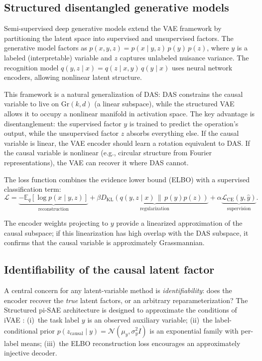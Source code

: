 \documentclass{article}
\newcommand{\Gr}{\mathrm{Gr}}
\begin{document}
\subsection{Structured disentangled generative models}
\label{sec:structured_vae}

Semi-supervised deep generative models \citep{narayanaswamy2017learning} extend
the VAE framework \citep{kingma2014auto} by partitioning the latent space into
supervised and unsupervised factors. The generative model factors as
$p(x, y, z) = p(x \mid y, z) \, p(y) \, p(z)$, where $y$ is a labeled
(interpretable) variable and $z$ captures unlabeled nuisance variance. The
recognition model $q(y, z \mid x) = q(z \mid x, y) \, q(y \mid x)$ uses neural
network encoders, allowing nonlinear latent structure.

This framework is a natural generalization of DAS: DAS constrains the causal
variable to live on $\Gr(k,d)$ (a linear subspace), while the structured VAE
allows it to occupy a nonlinear manifold in activation space. The key advantage
is disentanglement: the supervised factor $y$ is trained to predict the
operation's output, while the unsupervised factor $z$ absorbs everything else.
If the causal variable is linear, the VAE encoder should learn a rotation
equivalent to DAS. If the causal variable is nonlinear (e.g., circular
structure from Fourier representations), the VAE can recover it where DAS
cannot.

The loss function combines the evidence lower bound (ELBO) with a supervised
classification term:
\begin{equation}
\mathcal{L} = \underbrace{-\mathbb{E}_{q}[\log p(x \mid y, z)]}_{\text{reconstruction}}
+ \beta \underbrace{D_\mathrm{KL}(q(y,z \mid x) \,\|\, p(y) p(z))}_{\text{regularization}}
+ \alpha \underbrace{\mathcal{L}_\text{CE}(y, \hat{y})}_{\text{supervision}}.
\label{eq:vae_loss}
\end{equation}

The encoder weights projecting to $y$ provide a linearized approximation of the
causal subspace; if this linearization has high overlap with the DAS subspace,
it confirms that the causal variable is approximately Grassmannian.

\subsection{Identifiability of the causal latent factor}
\label{sec:identifiability}

A central concern for any latent-variable method is \emph{identifiability}:
does the encoder recover the \emph{true} latent factors, or an arbitrary
reparameterization? The Structured pi-SAE architecture is designed to
approximate the conditions of iVAE \citep{khemakhem2020variational}:
(i)~the task label $y$ is an observed auxiliary variable;
(ii)~the label-conditional prior
$p(z_\text{causal} \mid y) = \mathcal{N}(\mu_y, \sigma_y^2 I)$ is an
exponential family with per-label means; (iii)~the ELBO reconstruction
loss encourages an approximately injective decoder.
\end{document}
